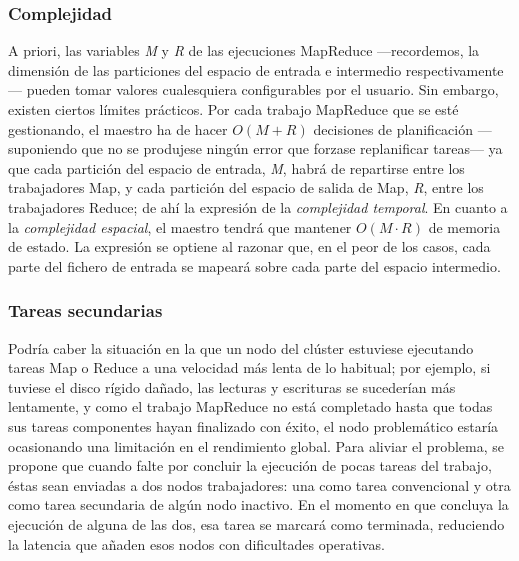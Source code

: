 \subsubsection{Complejidad}\label{subsubsec:complejidad}
\noindent A priori, las variables \emph{M} y \emph{R} de las ejecuciones MapReduce ---recordemos, la dimensi\'on de las particiones del espacio de entrada e intermedio res\-pec\-ti\-va\-men\-te--- pueden tomar valores cualesquiera configurables por el usuario. Sin embargo, existen ciertos l\'imites pr\'acticos. Por cada trabajo MapReduce que se est\'e gestionando, el maestro ha de hacer $O(M + R)$ decisiones de planificaci\'on ---suponiendo que no se produjese ning\'un error que forzase replanificar tareas--- ya que cada partici\'on del espacio de entrada, \emph{M}, habr\'a de repartirse entre los trabajadores Map, y cada partici\'on del espacio de salida de Map, \emph{R}, entre los trabajadores Reduce; de ah\'i la expresi\'on de la \emph{complejidad temporal}. En cuanto a la \emph{complejidad espacial}, el maestro tendr\'a que mantener $O(M \cdot R)$ de memoria de estado. La expresi\'on se optiene al razonar que, en el peor de los casos, cada parte del fichero de entrada se mapear\'a sobre cada parte del espacio intermedio.


\subsubsection{Tareas secundarias}\label{subsubsec:secundarias}
\noindent Podr\'ia caber la situaci\'on en la que un nodo del cl\'uster estuviese ejecutando tareas Map o Reduce a una velocidad m\'as lenta de lo habitual; por ejemplo, si tuviese el disco r\'igido da\~nado, las lecturas y escrituras se suceder\'ian m\'as lentamente, y como el trabajo MapReduce no est\'a completado hasta que todas sus tareas componentes hayan finalizado con \'exito, el nodo problem\'atico estar\'ia ocasionando una limitaci\'on en el rendimiento global. Para aliviar el problema, se propone que cuando falte por concluir la ejecuci\'on de pocas ta\-re\-as del trabajo, \'estas sean enviadas a dos nodos trabajadores: una como tarea convencional y otra como tarea secundaria de alg\'un nodo inactivo. En el momento en que concluya la ejecuci\'on de alguna de las dos, esa tarea se marcar\'a como terminada, reduciendo la latencia que a\~naden esos nodos con dificultades operativas.


